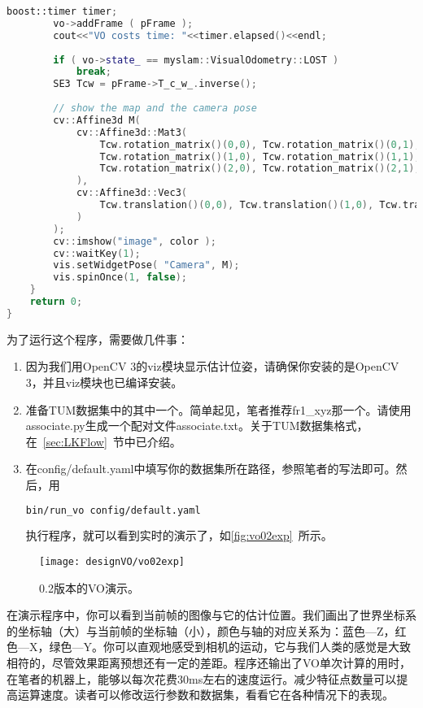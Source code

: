 \begin{lstlisting}[language=c++,caption=slambook/project/0.2/test/run\_vo.cpp]
		boost::timer timer;
		vo->addFrame ( pFrame );
		cout<<"VO costs time: "<<timer.elapsed()<<endl;
		
		if ( vo->state_ == myslam::VisualOdometry::LOST )
			break;
		SE3 Tcw = pFrame->T_c_w_.inverse();
		
		// show the map and the camera pose 
		cv::Affine3d M(
			cv::Affine3d::Mat3( 
				Tcw.rotation_matrix()(0,0), Tcw.rotation_matrix()(0,1), Tcw.rotation_matrix()(0,2),
				Tcw.rotation_matrix()(1,0), Tcw.rotation_matrix()(1,1), Tcw.rotation_matrix()(1,2),
				Tcw.rotation_matrix()(2,0), Tcw.rotation_matrix()(2,1), Tcw.rotation_matrix()(2,2)
			), 
			cv::Affine3d::Vec3(
				Tcw.translation()(0,0), Tcw.translation()(1,0), Tcw.translation()(2,0)
			)
		);
		cv::imshow("image", color );
		cv::waitKey(1);
		vis.setWidgetPose( "Camera", M);
		vis.spinOnce(1, false);
	}
	return 0;
}
\end{lstlisting}

为了运行这个程序，需要做几件事：

\begin{enumerate}
	\item 因为我们用OpenCV 3的viz模块显示估计位姿，请确保你安装的是OpenCV 3，并且viz模块也已编译安装。
	\item 准备TUM数据集中的其中一个。简单起见，笔者推荐fr1\_xyz那一个。请使用associate.py生成一个配对文件associate.txt。关于TUM数据集格式，在~\ref{sec:LKFlow}~节中已介绍。
	\item 在config/default.yaml中填写你的数据集所在路径，参照笔者的写法即可。然后，用
\begin{lstlisting}[language=sh]
bin/run_vo config/default.yaml
\end{lstlisting}
	执行程序，就可以看到实时的演示了，如\autoref{fig:vo02exp}~所示。
\end{enumerate}

\begin{figure}[!htp]
	\centering    
	\texttt{[image: designVO/vo02exp]}\\
	\caption{0.2版本的VO演示。}
	\label{fig:vo02exp}
\end{figure}

在演示程序中，你可以看到当前帧的图像与它的估计位置。我们画出了世界坐标系的坐标轴（大）与当前帧的坐标轴（小），颜色与轴的对应关系为：蓝色—Z，红\mbox{色—X}，绿色—Y。你可以直观地感受到相机的运动，它与我们人类的感觉是大致相符的，尽管效果距离预想还有一定的差距。程序还输出了VO单次计算的用时，在笔者的机器上，能够以每次花费30ms左右的速度运行。减少特征点数量可以提高运算速度。读者可以修改运行参数和数据集，看看它在各种情况下的表现。

